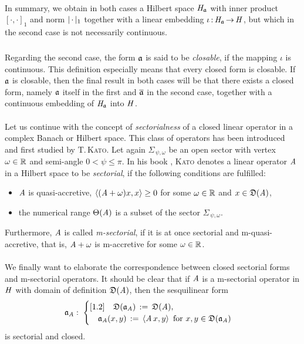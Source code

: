 \documentclass[11pt,twoside]{article}
\begin{document}
\paragraph*{} %
In summary,
we obtain in both cases a Hilbert space $\mathit{H}_{\mathfrak{a}}$ with inner product
$[\cdot,\cdot]_1$ and norm $\abs{\,\cdot\,} _1$ together with a linear embedding
$\iota{\,:\,} \mathit{H}_{\mathfrak{a}} {\,\to\,} \mathit{H}$,
but which in the second case is not necessarily continuous.

\subparagraph*{} 
Regarding the second case,
the form $\mathfrak{a}$ is said to be \textit{closable},
if the mapping $\iota$ is continuous.
This definition especially means that every closed form is closable.
If $\mathfrak{a}$ is closable,
then the final result in both cases will be
that there exists a closed form,
namely $\mathfrak{a}$ itself in the first and $\overline{\mathfrak{a}}$ in the second case,
together with a continuous embedding of $\mathit{H}_{\mathfrak{a}}$ into $\mathit{H}$.

\paragraph*{} %
Let us continue with the concept of \textit{sectorialness}
of a closed linear operator in a complex Banach or Hilbert space.
This class of operators has been introduced and first studied
by \textsc{T.\,Kato}.
Let again $\Sigma_{\,\psi,\omega}$
be an open sector with vertex $\omega \in {\mathbb{R}}$ and semi-angle $0 < \psi \leq \pi$.
In his book \cite{VIII_Ka},
\textsc{Kato} denotes a linear operator $\mathit{A}$ in a Hilbert space
to be \textit{sectorial},
if the following conditions are fulfilled:

\begin{itemize}[labelsep=4mm,leftmargin=12mm]
\item[(S-1)]
$\mathit{A}$ is {quasi-accretive},
{\ie} $\langle (\mathit{A} + \omega) x,x \rangle \geq 0$
for some $\omega \in {\mathbb{R}}$ and $x \in \mathfrak{D}(\mathit{A})$,

\item[(S-2)]
the numerical range $\Theta(\mathit{A})$ is a subset of the sector
$\Sigma_{\,\psi,\omega}$.
\end{itemize}

Furthermore,
$\mathit{A}$ is called \textit{m-sectorial},
if it is at once sectorial and m-quasi-accretive,
that is,
$\mathit{A} + \omega$ is m-accretive for some $\omega \in {\mathbb{R}}$.

\paragraph*{} %
We finally want to elaborate the correspondence
between closed sectorial forms and m-sectorial operators.
It should be clear
that if $\mathit{A}$ is a m-sectorial operator in $\mathit{H}$
with domain of definition $\mathfrak{D}(\mathit{A})$,
then the sesquilinear form
\[
\mathfrak{a}_{\mathit{A}}: \;
\begin{cases}[1.2]
\quad \mathfrak{D}(\mathfrak{a}_{\mathit{A}}) \,:=\, \mathfrak{D}(\mathit{A}), \\
\quad \mathfrak{a}_{\mathit{A}}(x,y) \,:=\, \langle \mathit{A} \,x,y \rangle
\, \mbox{ for } x,y \in \mathfrak{D}(\mathfrak{a}_{\mathit{A}}) \\
\end{cases}
\]
is sectorial and closed.
\end{document}
